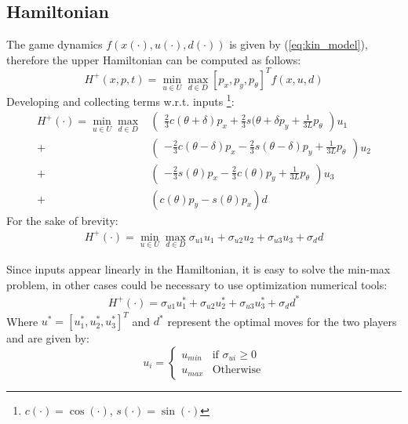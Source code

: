 \subsection{Hamiltonian}
The game dynamics $f(x(\cdot), u(\cdot), d(\cdot))$ is given by (\ref{eq:kin_model}), therefore the upper Hamiltonian can be computed as follows:
\begin{equation*}
  H^+(x,p,t) = \min_{u \in U}\max_{d \in D} [p_x, p_y, p_{\theta}]^T f(x, u, d)
\end{equation*}
Developing and collecting terms w.r.t. inputs \footnote{$c(\cdot)=\cos(\cdot)$, $s(\cdot)=\sin(\cdot)$}:
\begin{equation*}
  \begin{split}
    H^{+}(\cdot) = \min_{u \in U}\max_{d \in D} 
    &
      \begin{pmatrix}
        \frac{2}{3}c{(\theta + \delta)}p_x +  \frac{2}{3}s{(\theta + \delta }p_y + \frac{1}{3L}p_{\theta}
      \end{pmatrix}u_{1} 
    \\ +  
    &
      \begin{pmatrix}
        -\frac{2}{3}c{(\theta -\delta)}p_x -\frac{2}{3}s{(\theta -\delta)}p_y + \frac{1}{3L}p_{\theta} 
      \end{pmatrix}u_{2} 
    \\ +  
    &
      \begin{pmatrix}
        -\frac{2}{3}s{(\theta)}p_x -\frac{2}{3}c{(\theta)}p_y + \frac{1}{3L}p_{\theta} 
      \end{pmatrix}u_{3} 
    \\ + 
    &
      (c{(\theta)}p_y-s{(\theta)}p_x)d
  \end{split}
\end{equation*}
For the sake of brevity:
\begin{equation*}
  \begin{split}
    H^{+}(\cdot) = \min_{u \in U}\max_{d \in D} \sigma_{u1} u_{1} +\sigma_{u2} u_{2} + \sigma_{u3} u_{3} + \sigma_{d} d
  \end{split}
\end{equation*}

Since inputs appear linearly in the Hamiltonian, it is easy to solve the min-max problem, in other cases could be necessary to use optimization numerical tools:
\begin{equation}
  \begin{split}
    H^{+}(\cdot) = \sigma_{u1} u_{1}^* +\sigma_{u2} u_{2}^* + \sigma_{u3} u_{3}^* + \sigma_{d} d^*
  \end{split}
  \label{opt_ham}
\end{equation}
Where $u^* = [u_1^*, u_2^*, u_3^*]^T$ and $d^*$ represent the optimal moves for the two players and are given by:
\begin{equation*}
  u_i = 
	\begin{cases} 
		u_{min} &\text{if } \sigma_{ui} \geq 0\\
		u_{max} &\text{Otherwise} 
	\end{cases}
\end{equation*}


